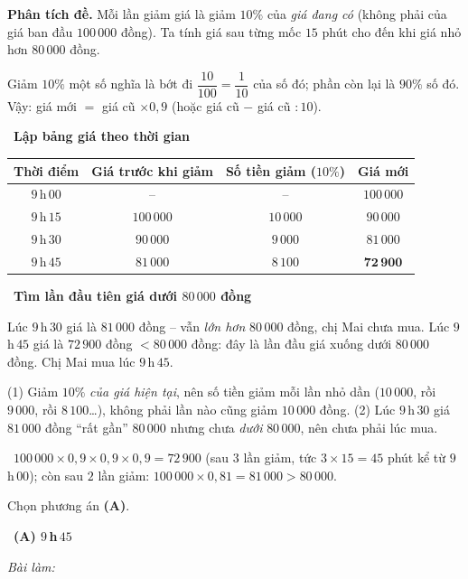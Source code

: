 \documentclass[11pt]{article}
\newif\ifsol \solfalse
\providecommand{\AnsWord}{Đáp số}
\newcommand{\ans}[1]{\par\smallskip{\bfseries\color{tmGreen!88!black}\AnsWord:}\ {\bfseries\color{AnsRed}#1}\par}
\newcommand{\probsol}[1]{%
  \begin{lrbox}{\solmeasure}\begin{minipage}{\dimexpr\linewidth-24pt\relax}#1\end{minipage}\end{lrbox}%
  \ifsol
    \begin{solbox}#1\end{solbox}%
  \else
    \setlength{\solht}{\dimexpr\ht\solmeasure+\dp\solmeasure+0.85cm\relax}%
    \ifdim\solht<1.35cm\setlength{\solht}{1.35cm}\fi
    \ifdim\solht>\StudentMaxWork\setlength{\solht}{\StudentMaxWork}\fi
    \begin{tcolorbox}[colback=white,colframe=Line,boxrule=0.8pt,arc=5pt,
      left=8pt,right=8pt,top=4pt,bottom=4pt,height=\solht]{\footnotesize\color{Slate}\itshape\WorkWord}\end{tcolorbox}%
  \fi}
\newlength{\StudentMaxWork}\setlength{\StudentMaxWork}{7.5cm}
\newcommand{\step}[2]{\par\smallskip\noindent{\bfseries\color{tmBlue!85!black}\StepWord~#1.}\ {\bfseries #2}\par\nopagebreak}
\newcommand{\verify}[1]{\par\smallskip\noindent{\bfseries\color{tmGreen!80!black}\faCheckCircle\ \CheckWord}\ #1\par}
\def\WorkWord{Bài làm:}
\def\AnsWord{Đáp số}
\def\StepWord{Bước}
\def\CheckWord{Thử lại:}
\begin{document}
\probsol{
\textbf{Phân tích đề.} Mỗi lần giảm giá là giảm $10\%$ của \emph{giá đang có} (không phải của giá ban đầu $100\,000$ đồng). Ta tính giá sau từng mốc $15$ phút cho đến khi giá nhỏ hơn $80\,000$ đồng.

\begin{recallbox}Giảm $10\%$ một số nghĩa là bớt đi $\dfrac{10}{100}=\dfrac1{10}$ của số đó; phần còn lại là $90\%$ số đó. Vậy: giá mới $=$ giá cũ $\times 0{,}9$ (hoặc giá cũ $-$ giá cũ $:10$).\end{recallbox}

\step{1}{Lập bảng giá theo thời gian}
\begin{center}
\begin{tabular}{|c|c|c|c|}
\hline
\rowcolor{Tint}\textbf{Thời điểm} & \textbf{Giá trước khi giảm} & \textbf{Số tiền giảm ($10\%$)} & \textbf{Giá mới}\\
\hline
$9\,$h$\,00$ & -- & -- & $100\,000$\\
$9\,$h$\,15$ & $100\,000$ & $10\,000$ & $90\,000$\\
$9\,$h$\,30$ & $90\,000$ & $9\,000$ & $81\,000$\\
$9\,$h$\,45$ & $81\,000$ & $8\,100$ & $\mathbf{72\,900}$\\
\hline
\end{tabular}
\end{center}

\step{2}{Tìm lần đầu tiên giá dưới $80\,000$ đồng}
Lúc $9\,$h$\,30$ giá là $81\,000$ đồng -- vẫn \emph{lớn hơn} $80\,000$ đồng, chị Mai chưa mua. Lúc $9\,$h$\,45$ giá là $72\,900$ đồng $<80\,000$ đồng: đây là lần đầu giá xuống dưới $80\,000$ đồng. Chị Mai mua lúc $9\,$h$\,45$.

\begin{warnbox}(1) Giảm $10\%$ \emph{của giá hiện tại}, nên số tiền giảm mỗi lần nhỏ dần ($10\,000$, rồi $9\,000$, rồi $8\,100$\dots), không phải lần nào cũng giảm $10\,000$ đồng. (2) Lúc $9\,$h$\,30$ giá $81\,000$ đồng ``rất gần'' $80\,000$ nhưng chưa \emph{dưới} $80\,000$, nên chưa phải lúc mua.\end{warnbox}

\verify{$100\,000\times 0{,}9\times 0{,}9\times 0{,}9=72\,900$ (sau $3$ lần giảm, tức $3\times 15=45$ phút kể từ $9\,$h$\,00$); còn sau $2$ lần giảm: $100\,000\times0{,}81=81\,000>80\,000$.}
Chọn phương án \textbf{(A)}.
\ans{(A) $9\,$h$\,45$}
}
\end{document}
